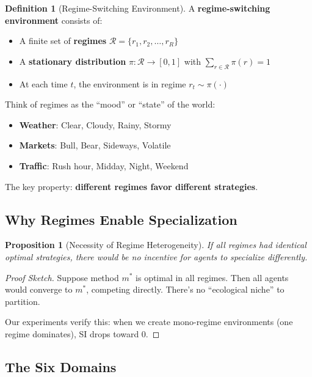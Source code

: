 \documentclass[11pt,a4paper]{article}
\theoremstyle{definition}
\newtheorem{definition}{Definition}[section]
\theoremstyle{plain}
\newtheorem{proposition}{Proposition}[section]
\begin{document}
\begin{definition}[Regime-Switching Environment]
A \textbf{regime-switching environment} consists of:
\begin{itemize}
    \item A finite set of \textbf{regimes} $\mathcal{R} = \{r_1, r_2, \ldots, r_R\}$
    \item A \textbf{stationary distribution} $\pi: \mathcal{R} \to [0, 1]$ with $\sum_{r \in \mathcal{R}} \pi(r) = 1$
    \item At each time $t$, the environment is in regime $r_t \sim \pi(\cdot)$
\end{itemize}
\end{definition}

\begin{intuition}
Think of regimes as the ``mood'' or ``state'' of the world:
\begin{itemize}
    \item \textbf{Weather}: Clear, Cloudy, Rainy, Stormy
    \item \textbf{Markets}: Bull, Bear, Sideways, Volatile
    \item \textbf{Traffic}: Rush hour, Midday, Night, Weekend
\end{itemize}
The key property: \textbf{different regimes favor different strategies}.
\end{intuition}

\subsection{Why Regimes Enable Specialization}

\begin{proposition}[Necessity of Regime Heterogeneity]
If all regimes had identical optimal strategies, there would be no incentive for agents to specialize differently.
\end{proposition}

\begin{proof}[Proof Sketch]
Suppose method $m^*$ is optimal in all regimes. Then all agents would converge to $m^*$, competing directly. There's no ``ecological niche'' to partition.

Our experiments verify this: when we create mono-regime environments (one regime dominates), SI drops toward 0.
\end{proof}

\subsection{The Six Domains}
\end{document}
